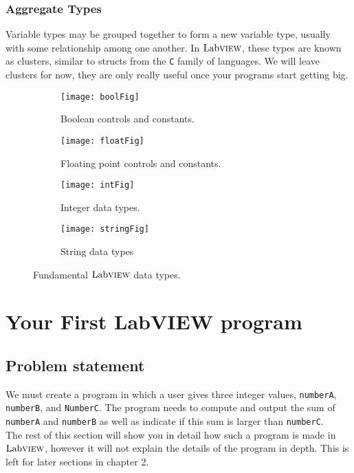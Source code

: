 	\subsubsection{Aggregate Types}
	Variable types may be grouped together to form a new variable type, usually with some relationship among one another. In $\text{Lab}\textsc{view}$, these types are known as clusters, similar to structs from the \texttt{C} family of languages. We will leave clusters for now, they are only really useful once your programs start getting big.
	\begin{figure}
		\centering
		\begin{subfigure}[b]{0.49\textwidth}
			\centering
			\texttt{[image: boolFig]}
			\caption{Boolean controls and constants.}
			\label{boolFig}
		\end{subfigure}
		\hfill
		\begin{subfigure}[b]{0.49\textwidth}
			\centering
			\texttt{[image: floatFig]}
			\caption{Floating point controls and constants.}
			\label{floatFig}
		\end{subfigure}
		\vfill
		\begin{subfigure}[b]{0.49\textwidth}
			\centering
			\texttt{[image: intFig]}
			\caption{Integer data types.}
			\label{intFig}
		\end{subfigure}
		\hfill
		\begin{subfigure}[b]{0.49\textwidth}
			\centering
			\texttt{[image: stringFig]}
			\caption{String data types}
			\label{stringFig}
		\end{subfigure}
		\caption{Fundamental $\text{Lab}\textsc{view}$ data types.}
		\label{DataTypes}
	\end{figure}
	
	\section{Your First LabVIEW program}
	\subsection{Problem statement}
	We must create a program in which a user gives three integer values, \texttt{numberA}, \texttt{numberB}, and \texttt{NumberC}. The program needs to compute and output the sum of \texttt{numberA} and \texttt{numberB} as well as indicate if this sum is larger than \texttt{numberC}.\\
	
	The rest of this section will show you in detail how such a program is made in $\text{Lab}\textsc{view}$, however it will not explain the details of the program in depth. This is left for later sections in chapter 2.\\%

